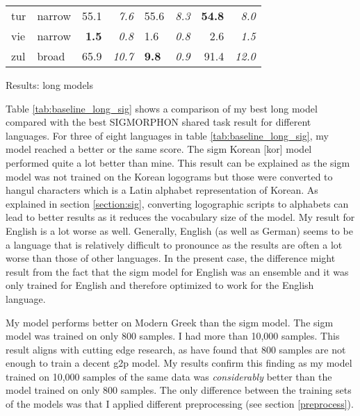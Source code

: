 {\begin{tabularx}{1.2\textwidth}{|l|X||r|r||X|X||r|r|}
tur       & narrow        & 55.1         & \textit{7.6}    & 55.6         & \textit{8.3}          & \textbf{54.8}   & \textit{8.0}    \\
vie       & narrow        & \textbf{1.5} & \textit{0.8}    & 1.6          & \textit{0.8}          & 2.6    & \textit{1.5}    \\
zul       & broad         & 65.9         & \textit{10.7}   & \textbf{9.8}          & \textit{0.9}          & 91.4   & \textit{12.0}   \\ \hline
\end{tabularx}
}{Results: long models}

Table \ref{tab:baseline_long_sig} shows a comparison of my best long model compared with the best SIGMORPHON shared task result for different languages. For three of eight languages in table \ref{tab:baseline_long_sig}, my model reached a better or the same score. The \ac{sigm} Korean [kor] model performed quite a lot better than mine. This result can be explained as the \ac{sigm} model was not trained on the Korean logograms but those were converted to hangul characters which is a Latin alphabet representation of Korean. As explained in section \ref{section:sig}, converting logographic scripts to alphabets can lead to better results as it reduces the vocabulary size of the model. My result for English is a lot worse as well. Generally, English (as well as German) seems to be a language that is relatively difficult to pronounce as the results are often a lot worse than those of other languages. In the present case, the difference might result from the fact that the \ac{sigm} model for English was an ensemble and it was only trained for English and therefore optimized to work for the English language. 

My model performs better on Modern Greek than the \ac{sigm} model. The \ac{sigm} model was trained on only 800 samples. I had more than 10,000 samples. This result aligns with cutting edge research, as \citet{Ashby-Bartley.2021} have found that 800 samples are not enough to train a decent \ac{g2p} model. My results confirm this finding as my model trained on 10,000 samples of the same data was \textit{considerably} better than the model trained on only 800 samples. The only difference between the training sets of the models was that I applied different preprocessing (see section \ref{preprocess}). 

